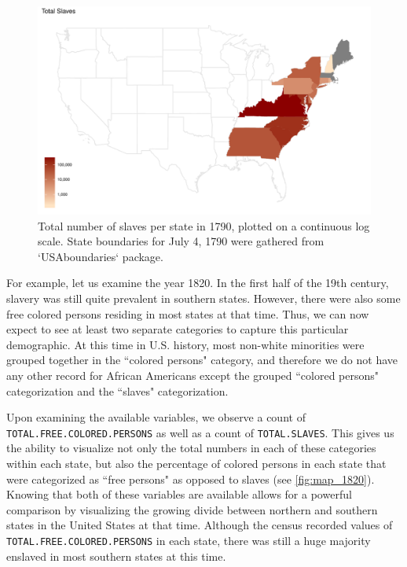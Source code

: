 \documentclass[DIV=calc, paper=a4, fontsize=10pt, twocolumn]{scrartcl}\usepackage[]{graphicx}\usepackage[]{color}
\newenvironment{knitrout}{}{} %
\begin{document}
\begin{knitrout}
\color{fgcolor}\begin{figure}[h]
\includegraphics[width=.5\textwidth]{figure/map_1790-1} \caption[Total number of slaves per state in 1790, plotted on a continuous log scale]{Total number of slaves per state in 1790, plotted on a continuous log scale. State boundaries for July 4, 1790 were gathered from `USAboundaries` package.}\label{fig:map_1790}
\end{figure}


\end{knitrout}



\par For example, let us examine the year 1820. In the first half of the 19th century, slavery was still quite prevalent in southern states. However, there were also some free colored persons residing in most states at that time. Thus, we can now expect to see at least two separate categories to capture this particular demographic. At this time in U.S. history, most non-white minorities were grouped together in the ``colored persons" category, and therefore we do not have any other record for African Americans except the grouped ``colored persons" categorization and the ``slaves" categorization. 

\par Upon examining the available variables, we observe a count of \texttt{TOTAL.FREE.COLORED.PERSONS} as well as a count of \texttt{TOTAL.SLAVES}. This gives us the ability to visualize not only the total numbers in each of these categories within each state, but also the percentage of colored persons in each state that were categorized as ``free persons" as opposed to slaves (see \autoref{fig:map_1820}). Knowing that both of these variables are available allows for a powerful comparison by visualizing the growing divide between northern and southern states in the United States at that time. Although the census recorded values of \texttt{TOTAL.FREE.COLORED.PERSONS} in each state, there was still a huge majority enslaved in most southern states at this time.  
\end{document}
